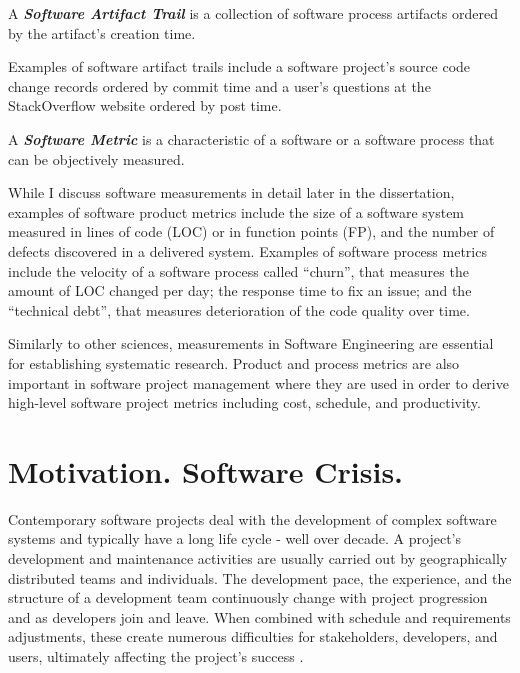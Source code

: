 \begin{defn}\label{def_artifact_trail}
A \textbf{\textit{Software Artifact Trail}} is a collection of software process artifacts ordered by the 
artifact's creation time.
\end{defn}
Examples of software artifact trails include a software project's source code change records ordered by 
commit time and a user's questions at the StackOverflow website ordered by post time.

\begin{defn}\label{def_metric}
A \textbf{\textit{Software Metric}} is a characteristic of a software or a software process that can be 
objectively measured. 
\end{defn}
While I discuss software measurements in detail later in the dissertation, examples of software product metrics include 
the size of a software system measured in lines of code (LOC) or in function points (FP), and the number of 
defects discovered in a delivered system. 
Examples of software process metrics include the velocity of a software process\textbf{} called ``churn'', that 
measures the amount of LOC changed per day; the response time to fix an issue; and the ``technical debt'', 
that measures deterioration of the code quality over time. 

Similarly to other sciences, measurements in Software Engineering are essential for establishing systematic 
research. Product and process metrics are also important in software project management where they are 
used in order to derive high-level software project metrics including cost, schedule, and productivity.

%
%
\section{Motivation. Software Crisis.}\label{section_background}
Contemporary software projects deal with the development of complex software systems and typically have 
a long life cycle - well over decade.
A project's development and maintenance activities are usually carried out by geographically 
distributed teams and individuals. The development pace, the experience, and the structure of a 
development team continuously change with project progression and as developers join and leave. 
When combined with schedule and requirements adjustments, these create numerous difficulties 
for stakeholders, developers, and users, ultimately affecting the project's success \cite{citeulike:2207657}. 

